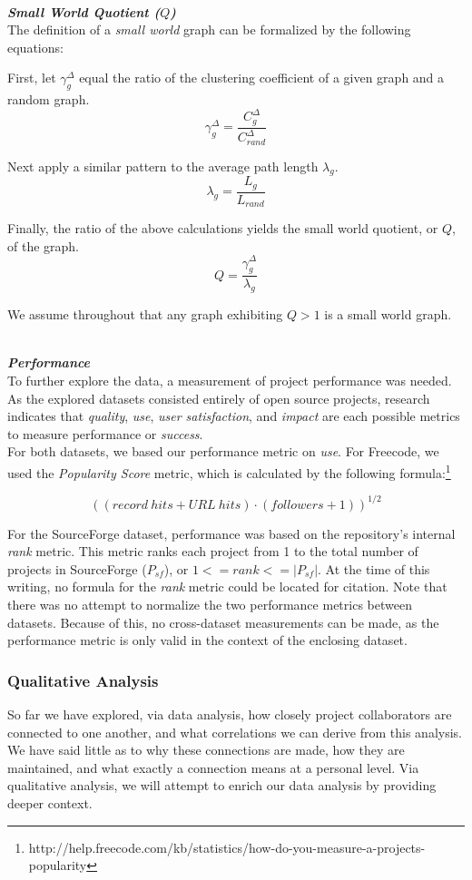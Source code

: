 \documentclass{proc}
\begin{document}
\noindent\\\textit{\textbf{Small World Quotient ($Q$)}}\\
The definition of a \textit{small world} graph can be formalized by the following equations\cite{humphries2008network,uzzi2005collaboration}:

First, let $\gamma^{\Delta}_g$ equal the ratio of the clustering coefficient of a given graph and a random graph.
\[\gamma^{\Delta}_g = \frac{C^{\Delta}_g }{C^{\Delta}_{rand} } \]

Next apply a similar pattern to the average path length $\lambda_g$.
\[\lambda_g = \frac{L_g }{L_{rand} } \]

Finally, the ratio of the above calculations yields the small world quotient, or $Q$, of the graph.
\[Q = \frac{\gamma^{\Delta}_g }{\lambda_g} \]

We assume throughout that any graph exhibiting {$Q > 1$} is a small world graph.

\noindent\\\textit{\textbf{Performance}}\\
To further explore the data, a measurement of project performance was needed. As the explored datasets consisted entirely of open source projects, research indicates that \textit{quality}, \textit{use}, \textit{user satisfaction}, and \textit{impact} are each possible metrics to measure performance or \textit{success}\cite{crowston2003defining}.\\

For both datasets, we based our performance metric on \textit{use}. For Freecode, we used the \textit{Popularity Score} metric, which is calculated by the following formula:\footnote{http://help.freecode.com/kb/statistics/how-do-you-measure-a-projects-popularity}

\[ ((record\ hits + URL\ hits) \cdot (followers + 1))^{1/2} \]

For the SourceForge dataset, performance was based on the repository's internal \textit{rank} metric. This metric ranks each project from 1 to the total number of projects in SourceForge ($P_{sf}$), or ${1 <= rank <= |P_{sf}|}$. At the time of this writing, no formula for the \textit{rank} metric could be located for citation.  Note that there was no attempt to normalize the two performance metrics between datasets. Because of this, no cross-dataset measurements can be made, as the performance metric is only valid in the context of the enclosing dataset. 

\subsubsection{Qualitative Analysis}
So far we have explored, via data analysis, how closely project collaborators are connected to one another, and what correlations we can derive from this analysis. We have said little as to why these connections are made, how they are maintained, and what exactly a connection means at a personal level. Via qualitative analysis, we will attempt to enrich our data analysis by providing deeper context.
\end{document}

